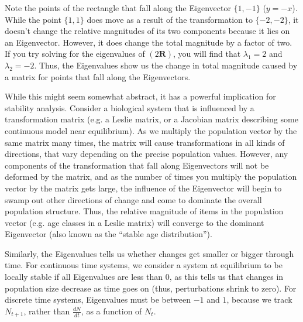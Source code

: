 \documentclass[12pt]{article}
\begin{document}
Note the points of the rectangle that fall along the Eigenvector $\{1,-1\}$ ($y=-x$). While the point $\{1,1\}$ does move as a result of the transformation to $\{-2,-2\}$, it doesn't change the relative magnitudes of its two components because it lies on an Eigenvector. However, it does change the total magnitude by a factor of two. If you try solving for the eigenvalues of $(2\textbf{R})$, you will find that $\lambda_{1}=2$ and $\lambda_{2}=-2$. Thus, the Eigenvalues show us the change in total magnitude caused by a matrix for points that fall along the Eigenvectors.

While this might seem somewhat abstract, it has a powerful implication for stability analysis. Consider a biological system that is influenced by a transformation matrix (e.g. a Leslie matrix, or a Jacobian matrix describing some continuous model near equilibrium). As we multiply the population vector by the same matrix many times, the matrix will cause transformations in all kinds of directions, that vary depending on the precise population values. However, any components of the transformation that fall along Eigenvectors will not be deformed by the matrix, and as the number of times you multiply the population vector by the matrix gets large, the influence of the Eigenvector will begin to swamp out other directions of change and come to dominate the overall population structure. Thus, the relative magnitude of items in the population vector (e.g. age classes in a Leslie matrix) will converge to the dominant Eigenvector (also known as the ``stable age distribution'').

Similarly, the Eigenvalues tells us whether changes get smaller or bigger through time. For continuous time systems, we consider a system at equilibrium to be locally stable if all Eigenvalues are less than $0$, as this tells us that changes in population size decrease as time goes on (thus, perturbations shrink to zero). For discrete time systems, Eigenvalues must be between $-1$ and $1$, because we track $N_{t+1}$, rather than $\frac{dN}{dt}$, as a function of $N_{t}$.
\end{document}
